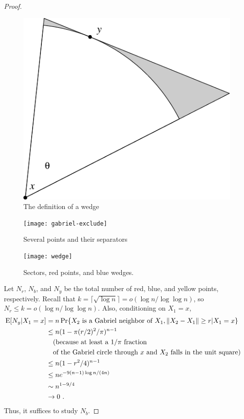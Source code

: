 \documentclass[lotsofwhite,charterfonts]{patmorin}
\newcommand{\PROB}{\Pr}
\newcommand{\EXP}{\mathrm{E}}
\begin{document}
\begin{proof}
\begin{figure}
\begin{center}\includegraphics{wedgedef-inkscape}\end{center}
\caption{The definition of a wedge}
\end{figure}


\begin{figure}
\begin{center}\texttt{[image: gabriel-exclude]}\end{center}
\caption{Several points and their separators}
\end{figure}

\begin{figure}
  \begin{center}
    \texttt{[image: wedge]}
  \end{center}
  \caption{Sectors, red points, and blue wedges.}
\end{figure}

Let $N_r$, $N_b$, and $N_y$ be the total number of red, blue, and yellow points,
respectively.  
Recall that $k=\lceil\sqrt{\log n}\rceil=o(\log n/\log\log n)$, so
$N_r \le k = o(\log n /\log \log n)$.
Also, conditioning on $X_1 = x$,
\[
\begin{aligned}
\EXP [N_y | X_1 = x] 
&= n \PROB \{ X_2 ~\hbox{\rm is a Gabriel neighbor of}~ X_1 , \| X_2 - X_1 \| \ge r | X_1 = x \} \cr
&\le n (1-\pi(r/2)^2/\pi)^{n-1} \cr
&\quad \hbox{\rm (because at least a $1/\pi$ fraction} \cr
&\quad \hbox{\rm of the Gabriel circle through $x$ and $X_2$ falls in the unit square)} \cr
&\le n (1-r^2/4)^{n-1} \cr
&\le n e^{-9(n-1) \log n / (4 n)} \cr
&\sim n^{1-9/4} \cr
&\to 0~. \cr
\end{aligned}
\]
Thus, it suffices to study $N_b$.


\end{proof}
\end{document}
